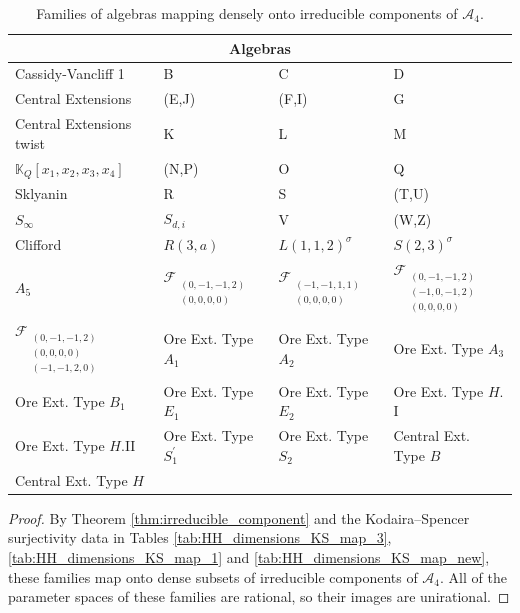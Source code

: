 \documentclass{amsart}
\begin{document}
\begin{table}[H]
    \centering
    \renewcommand{\arraystretch}{0.9}

    \begin{tabular}{|llll|}
        \hline
        \multicolumn{4}{|c|}{Algebras} \\
        \hline \hline
        Cassidy-Vancliff 1 & B & C & D \\
        Central Extensions & (E,J) & (F,I) & G \\
        Central Extensions twist &  K & L & M \\
        \(\mathbb{K}_Q[x_1, x_2, x_3, x_4]\) & (N,P) & O & Q \\
         Sklyanin & R & S & (T,U)  \\
        \(S_{\infty}\) &  \(S_{d,i}\) & V & (W,Z)  \\
         Clifford & $R(3,a)$& $L(1,1,2)^{\sigma}$ & $S(2,3)^{\sigma}$ \\
         $A_5$ & $\mathcal{F}_{\scriptscriptstyle\substack{(0,-1,-1,2) \\ (0,0,0,0)}}$ & $\mathcal{F}_{\scriptscriptstyle\substack{(-1,-1,1,1) \\ (0,0,0,0)}}$ & $\mathcal{F}_{\scriptscriptstyle\substack{(0,-1,-1,2) \\ (-1,0,-1,2) \\ (0,0,0,0)}}$ \\
         $\mathcal{F}_{\scriptscriptstyle\substack{(0,-1,-1,2) \\ (0,0,0,0) \\ (-1,-1,2,0)}}$ &  Ore Ext. Type $A_1$  & Ore Ext. Type $A_2$ & Ore Ext. Type $A_3$ \\
        Ore Ext. Type $B_1$ & Ore Ext. Type $E_1$  &  Ore Ext. Type $E_2$    & Ore Ext. Type $H.$I \\ 
         Ore Ext. Type $H.$II &  Ore Ext. Type $S_1^{'}$  &  Ore Ext. Type $S_2$    & Central Ext. Type $B$   \\
         Central Ext. Type $H$      &     &      &     \\
       \hline
    \end{tabular}
    \caption{Families of algebras mapping densely onto irreducible components of \(\mathcal{A}_4\).}
    \label{tab:comp}

\end{table}

\begin{proof}  
By Theorem \ref{thm:irreducible_component} and the Kodaira–Spencer surjectivity data in Tables \ref{tab:HH_dimensions_KS_map_3}, \ref{tab:HH_dimensions_KS_map_1} and \ref{tab:HH_dimensions_KS_map_new}, these families map onto dense subsets of irreducible components of \(\mathcal{A}_4\). All of the parameter spaces of these families are rational, so their images are unirational.  
\end{proof}
\end{document}
